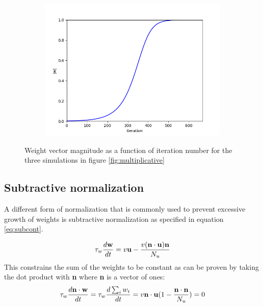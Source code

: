 \documentclass{article}
\begin{document}
\begin{figure}[h]
\begin{subfigure}[t]{0.30\linewidth}
		\subcaption{}
		\label{fig:sim2vec}	
	\end{subfigure}%
	\hspace{0.03\linewidth}
	\begin{subfigure}[t]{0.30\linewidth}
		\centering
		\includegraphics[width = 1.0\linewidth, trim={0 0 0 0}, clip=true]{figures/2d_sim3_vec.png}
		\subcaption{}
		\label{fig:sim3vec}	
	\end{subfigure}%
\caption{Weight vector magnitude as a function of iteration number for the three simulations in figure \ref{fig:multiplicative}}
\label{fig:multiplicativevec}
\end{figure}

\subsection{Subtractive normalization}

A different form of normalization that is commonly used to prevent excessive growth of weights is subtractive normalization as specified in equation \ref{eq:subcont}.

\begin{equation}\label{eq:subcont}
\tau_w \dfrac{d\bf{w}}{dt} = v {\bf{u}} - \dfrac{v(\bf{n}\cdot {\bf{u}}) {\bf{n}}}{N_u}
\end{equation}
This constrains the sum of the weights to be constant as can be proven by taking the dot product with \textbf{n} where \textbf{n} is a vector of ones:
\begin{equation}
\tau_w \dfrac{d\bf{n} \cdot \bf{w}}{dt} = \tau_w \dfrac{d\sum_i{w_i}}{dt} = v{\bf{n}} \cdot {\bf{u}}(1 - \dfrac{\bf{n}\cdot {\bf{n}}}{N_u}) = 0
\end{equation}
\end{document}
